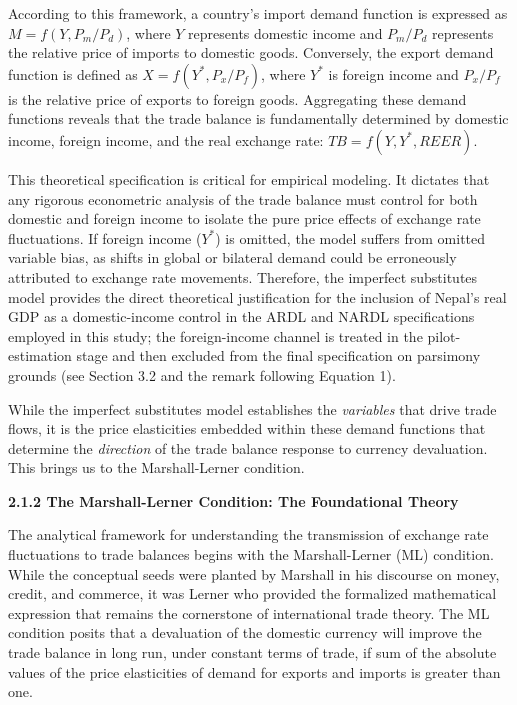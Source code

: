 \documentclass[12pt]{article}
\begin{document}
According to this framework, a country's import demand function is expressed as $M = f(Y, P_m/P_d)$, where $Y$ represents domestic income and $P_m/P_d$ represents the relative price of imports to domestic goods. Conversely, the export demand function is defined as $X = f(Y^*, P_x/P_f)$, where $Y^*$ is foreign income and $P_x/P_f$ is the relative price of exports to foreign goods. Aggregating these demand functions reveals that the trade balance is fundamentally determined by domestic income, foreign income, and the real exchange rate: $TB = f(Y, Y^*, REER)$. 

This theoretical specification is critical for empirical modeling. It dictates that any rigorous econometric analysis of the trade balance must control for both domestic and foreign income to isolate the pure price effects of exchange rate fluctuations. If foreign income ($Y^*$) is omitted, the model suffers from omitted variable bias, as shifts in global or bilateral demand could be erroneously attributed to exchange rate movements. Therefore, the imperfect substitutes model provides the direct theoretical justification for the inclusion of Nepal's real GDP as a domestic-income control in the ARDL and NARDL specifications employed in this study; the foreign-income channel is treated in the pilot-estimation stage and then excluded from the final specification on parsimony grounds (see Section 3.2 and the remark following Equation 1).

While the imperfect substitutes model establishes the \textit{variables} that drive trade flows, it is the price elasticities embedded within these demand functions that determine the \textit{direction} of the trade balance response to currency devaluation. This brings us to the Marshall-Lerner condition.

\noindent\textbf{2.1.2 The Marshall-Lerner Condition: The Foundational Theory}

The analytical framework for understanding the transmission of exchange rate fluctuations to trade balances begins with the Marshall-Lerner (ML) condition. While the conceptual seeds were planted by Marshall in his discourse on money, credit, and commerce, it was Lerner who provided the formalized mathematical expression that remains the cornerstone of international trade theory. The ML condition posits that a devaluation of the domestic currency will improve the trade balance in long run, under constant terms of trade, if sum of the absolute values of the price elasticities of demand for exports and imports is greater than one.
\end{document}
